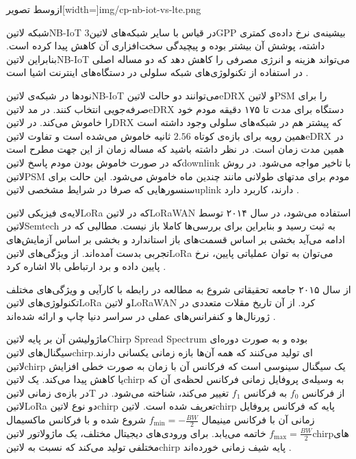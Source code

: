 ‌ازوسط
‌تصویر[width=\textwidth]{img/cp-nb-iot-vs-lte.png}

شبکه ‌لاتین{NB-IoT} در قیاس با سایر شبکه‌های ‌لاتین{3GPP} بیشینه‌ی نرخ داده‌ی کمتری داشته،
پوشش آن بیشتر بوده و پیچیدگی سخت‌افزاری آن کاهش پیدا کرده است.
بنابراین ‌لاتین{NB-IoT} می‌تواند هزینه و انرژی مصرفی را کاهش دهد که دو مساله اصلی در استفاده از تکنولوژی‌های
شبکه سلولی در دستگاه‌های اینترنت اشیا است
.

نودها در شبکه‌ی ‌لاتین{NB-IoT} می‌توانند دو حالت ‌لاتین{eDRX} و ‌لاتین{PSM} را برای صرفه‌جویی انتخاب کنند.
در مد ‌لاتین{eDRX} دستگاه برای مدت تا ۱۷۵ دقیقه مودم خود را خاموش می‌کند.
در ‌لاتین{DRX} که پیشتر هم در شبکه‌های سلولی وجود داشته است همین رویه برای بازه‌ی کوتاه $2.56$ ثانیه خاموش می‌شده است
و تفاوت ‌لاتین{eDRX} در همین مدت زمان است.
در نظر داشته باشید که مساله زمان از این جهت مطرح است که در صورت خاموش بودن مودم پاسخ ‌لاتین{downlink} با تاخیر مواجه می‌شود.
در روش ‌لاتین{PSM} مودم برای مدتهای طولانی مانند چندین ماه خاموش می‌شود.
این حالت برای سنسورهایی که صرفا در شرایط مشخصی ‌لاتین{uplink} دارند، کاربرد دارد
.


لایه‌ی فیزیکی ‌لاتین{LoRa} که در ‌لاتین{LoRaWAN} استفاده می‌شود، در سال ۲۰۱۴ توسط ‌لاتین{Semtech} به ثبت رسید
و بنابراین برای بررسی‌ها کاملا باز نیست. مطالبی که در ادامه می‌آید بخشی بر اساس قسمت‌های باز استاندارد و بخشی بر اساس آزمایش‌های
تجربی بدست آمده‌اند.
از ویژگی‌های ‌لاتین{LoRa} می‌توان به توان عملیاتی پایین، نرخ پایین داده و برد ارتباطی بالا اشاره کرد
.

از سال ۲۰۱۵ جامعه تحقیقاتی شروع به مطالعه در رابطه با کارآیی و ویژگی‌های مختلف تکنولوژی‌های ‌لاتین{LoRa} و ‌لاتین{LoRaWAN} کرد.
از آن تاریخ مقلات متعددی در ژورنال‌ها و کنفرانس‌های عملی در سراسر دنیا چاپ و ارائه شده‌اند
.

ماژولیشن آن بر پایه ‌لاتین{Chirp Spread Spectrum} بوده و به صورت دوره‌ای سیگنال‌های ‌لاتین{chirp}ای تولید می‌کنند که همه آن‌ها بازه زمانی یکسانی دارند.
‌لاتین{chirp} یک سیگنال سینوسی است که فرکانس آن با زمان به صورت خطی افزایش یا کاهش پیدا می‌کند.
یک ‌لاتین{chirp} به وسیله‌ی پروفایل زمانی فرکانس لحظه‌ی آن که در بازه‌ی زمانی ‌لاتین{T} از فرکانس $f_0$ به فرکانس $f_1$
تغییر می‌کند، شناخته می‌شود.
در ‌لاتین{LoRa} دو نوع ‌لاتین{chirp} تعریف شده است. ‌لاتین{chirp} پایه که فرکانس پروفایل زمانی آن با فرکانس مینیمال
\(f_{\min} = -\frac{BW}{2}\)
شروع شده و با فرکانس ماکسیمال
\(f_{\max} = \frac{BW}{2}\)
خاتمه می‌یابد.
برای ورودی‌های دیجیتال مختلف، یک ماژولاتور ‌لاتین{chirp}های مختلفی تولید می‌کند که نسبت به ‌لاتین{chirp} پایه شیف زمانی خورده‌اند
.

